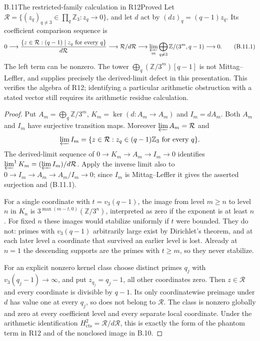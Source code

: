 \begin{statement}{B.11}{The restricted-family calculation in R12}{Proved}
Let $\mathcal R=\{(z_q)_{q\ne3}\in\prod_q\mathbb Z_3:z_q\to0\}$,
and let $d$ act by $(dz)_q=(q-1)z_q$. Its coefficient comparison
sequence is
\[
 0\longrightarrow
 \frac{\{z\in\mathcal R:(q-1)\mid z_q\text{ for every }q\}}{d\mathcal R}
 \longrightarrow\mathcal R/d\mathcal R
 \longrightarrow\varprojlim_m\bigoplus_{q\ne3}
             \mathbb Z/(3^m,q-1)\longrightarrow0.                \tag{B.11.1}
\]
The left term can be nonzero. The tower
$\bigoplus_q(\mathbb Z/3^m)[q-1]$ is not Mittag--Leffler, and
supplies precisely the derived-limit defect in this presentation.
This verifies the algebra of R12; identifying a particular arithmetic
obstruction with a stated vector still requires its arithmetic residue
calculation.
\end{statement}
\begin{proof}
Put $A_m=\bigoplus_q\mathbb Z/3^m$,
$K_m=\ker(d:A_m\to A_m)$ and $I_m=dA_m$.
Both $A_m$ and $I_m$ have surjective transition maps. Moreover
$\varprojlim A_m=\mathcal R$ and
\[
 \varprojlim I_m=
 \{z\in\mathcal R:z_q\in(q-1)\mathbb Z_3\text{ for every }q\}.
\]
The derived-limit sequence of $0\to K_m\to A_m\to I_m\to0$
identifies $\varprojlim^1K_m=(\varprojlim I_m)/d\mathcal R$.
Apply the inverse limit also to
$0\to I_m\to A_m\to A_m/I_m\to0$; since $I_m$ is
Mittag--Leffler it gives the asserted surjection and (B.11.1).

For a single coordinate with $t=v_3(q-1)$, the image from level
$m\geq n$ to level $n$ in $K_n$ is
$3^{\max(m-t,0)}(\mathbb Z/3^n)$, interpreted as zero if the
exponent is at least $n$. For fixed $n$ these images would stabilize
uniformly if $t$ were bounded. They do not: primes with
$v_3(q-1)$ arbitrarily large exist by Dirichlet's theorem, and at
each later level a coordinate that survived an earlier level is
lost. Already at $n=1$ the descending supports are the primes with
$t\geq m$, so they never stabilize.

For an explicit nonzero kernel class choose distinct primes $q_j$
with $v_3(q_j-1)\to\infty$, and put $z_{q_j}=q_j-1$, all other
coordinates zero. Then $z\in\mathcal R$ and every coordinate is
divisible by $q-1$. Its only coordinatewise preimage under $d$ has
value one at every $q_j$, so does not belong to $\mathcal R$.
The class is nonzero globally and zero at every coefficient level
and every separate local coordinate. Under the arithmetic
identification $H^2_{\mathrm{cts}}=\mathcal R/d\mathcal R$, this is
exactly the form of the phantom term in R12 and of the nonclosed
image in B.10.
\end{proof}

